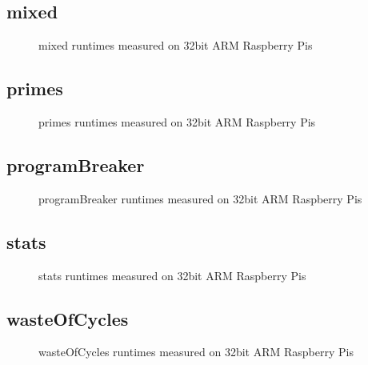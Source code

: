 \newpage
\subsection{mixed}
    
    \begin{figure}[h]
	    \centering
		
        \caption{mixed runtimes measured on 32bit ARM Raspberry Pis}
	\end{figure}
    


\newpage
\subsection{primes}
    
    \begin{figure}[h]
	    \centering
		
        \caption{primes runtimes measured on 32bit ARM Raspberry Pis}
	\end{figure}
    


\newpage
\subsection{programBreaker}
    
    \begin{figure}[h]
	    \centering
		
        \caption{programBreaker runtimes measured on 32bit ARM Raspberry Pis}
	\end{figure}
    


\newpage
\subsection{stats}
    
    \begin{figure}[h]
	    \centering
		
        \caption{stats runtimes measured on 32bit ARM Raspberry Pis}
	\end{figure}
    


\newpage
\subsection{wasteOfCycles}
    
    \begin{figure}[h]
	    \centering
		
        \caption{wasteOfCycles runtimes measured on 32bit ARM Raspberry Pis}
	\end{figure}
    

